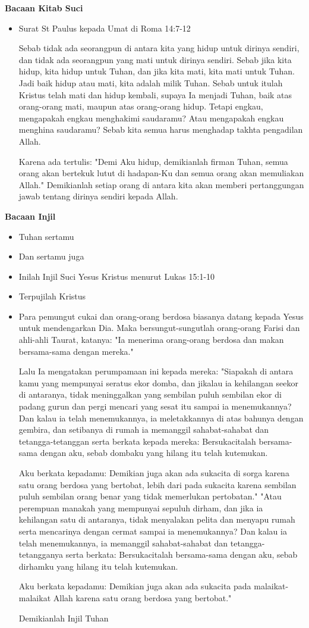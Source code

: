 \documentclass[a5paper,headsepline,titlepage,10pt,nnormalheadings,DIVcalc]{scrbook}
\makeatletter
\newcommand{\subjudul}[1]{%
  {\parindent \z@ 
    \interlinepenalty\@M \bfseries #1\par\nobreak \vskip 10\p@ }}
\newcommand{\BU}[1]{\begin{itemize} \item[U:] #1 \end{itemize}}
\newcommand{\BP}[1]{\begin{itemize} \item[P:] #1 \end{itemize}}
\makeatother
\begin{document}
\subjudul{Bacaan Kitab Suci}
\BP{Surat St Paulus kepada Umat di Roma 14:7-12	

Sebab tidak ada seorangpun di antara kita yang hidup untuk dirinya sendiri, dan tidak ada seorangpun yang mati untuk dirinya sendiri. Sebab jika kita hidup, kita hidup untuk Tuhan, dan jika kita mati, kita mati untuk Tuhan. Jadi baik hidup atau mati, kita adalah milik Tuhan.
Sebab untuk itulah Kristus telah mati dan hidup kembali, supaya Ia menjadi Tuhan, baik atas orang-orang mati, maupun atas orang-orang hidup.
Tetapi engkau, mengapakah engkau menghakimi saudaramu? Atau mengapakah engkau menghina saudaramu? Sebab kita semua harus menghadap takhta pengadilan Allah.

Karena ada tertulis: "Demi Aku hidup, demikianlah firman Tuhan, semua orang akan bertekuk lutut di hadapan-Ku dan semua orang akan memuliakan Allah."
Demikianlah setiap orang di antara kita akan memberi pertanggungan jawab tentang dirinya sendiri kepada Allah.}

\subjudul{Bacaan Injil}
\BP{Tuhan sertamu}
\BU{Dan sertamu juga}
\BP{Inilah Injil Suci Yesus Kristus menurut Lukas 15:1-10}
\BU{Terpujilah Kristus}

\BP{Para pemungut cukai dan orang-orang berdosa biasanya datang kepada Yesus untuk mendengarkan Dia.
Maka bersungut-sungutlah orang-orang Farisi dan ahli-ahli Taurat, katanya: "Ia menerima orang-orang berdosa dan makan bersama-sama dengan mereka."

Lalu Ia mengatakan perumpamaan ini kepada mereka:
"Siapakah di antara kamu yang mempunyai seratus ekor domba, dan jikalau ia kehilangan seekor di antaranya, tidak meninggalkan yang sembilan puluh sembilan ekor di padang gurun dan pergi mencari yang sesat itu sampai ia menemukannya?
Dan kalau ia telah menemukannya, ia meletakkannya di atas bahunya dengan gembira,
dan setibanya di rumah ia memanggil sahabat-sahabat dan tetangga-tetanggan serta berkata kepada mereka: Bersukacitalah bersama-sama dengan aku, sebab dombaku yang hilang itu telah kutemukan.

Aku berkata kepadamu: Demikian juga akan ada sukacita di sorga karena satu orang berdosa yang bertobat, lebih dari pada sukacita karena sembilan puluh sembilan orang benar yang tidak memerlukan pertobatan."
"Atau perempuan manakah yang mempunyai sepuluh dirham, dan jika ia kehilangan satu di antaranya, tidak menyalakan pelita dan menyapu rumah serta mencarinya dengan cermat sampai ia menemukannya?
Dan kalau ia telah menemukannya, ia memanggil sahabat-sahabat dan tetangga-tetangganya serta berkata: Bersukacitalah bersama-sama dengan aku, sebab dirhamku yang hilang itu telah kutemukan.

Aku berkata kepadamu: Demikian juga akan ada sukacita pada malaikat-malaikat Allah karena satu orang berdosa yang bertobat."

Demikianlah Injil Tuhan}
\end{document}
